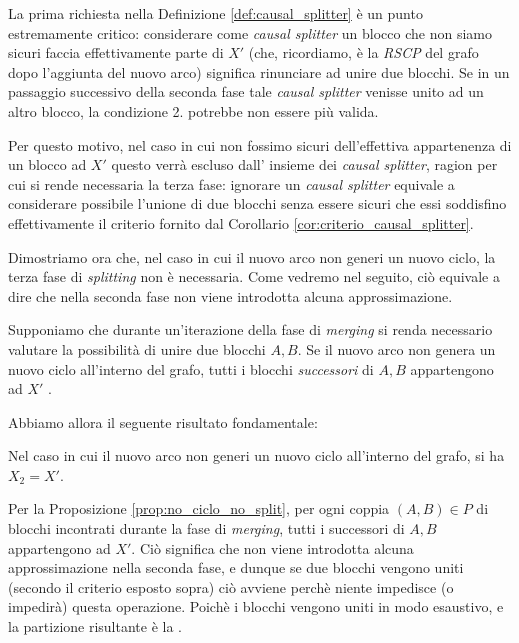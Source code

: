 La prima richiesta nella Definizione \ref{def:causal_splitter} è un punto estremamente critico: considerare come \emph{causal splitter} un blocco che non siamo sicuri faccia effettivamente parte di $X'$ (che, ricordiamo, è la \emph{RSCP} del grafo dopo l'aggiunta del nuovo arco) significa rinunciare ad unire due blocchi. Se in un passaggio successivo della seconda fase tale \emph{causal splitter} venisse unito ad un altro blocco, la condizione 2. potrebbe non essere più valida.

Per questo motivo, nel caso in cui non fossimo sicuri dell'effettiva appartenenza di un blocco ad $X'$ questo verrà escluso dall' insieme dei \emph{causal splitter}, ragion per cui si rende necessaria la terza fase: ignorare un \emph{causal splitter} equivale a considerare possibile l'unione di due blocchi senza essere sicuri che essi soddisfino effettivamente il criterio fornito dal Corollario \ref{cor:criterio_causal_splitter}.

Dimostriamo ora che, nel caso in cui il nuovo arco non generi un nuovo ciclo, la terza fase di \emph{splitting} non è necessaria. Come vedremo nel seguito, ciò equivale a dire che nella seconda fase non viene introdotta alcuna approssimazione.

\begin{proposition}
    \label{prop:no_ciclo_no_split}
    Supponiamo che durante un'iterazione della fase di \emph{merging} si renda necessario valutare la possibilità di unire due blocchi $A,B$. Se il nuovo arco non genera un nuovo ciclo all'interno del grafo, tutti i blocchi \emph{successori} di $A,B$ appartengono ad $X'$ \cite{saha}.
\end{proposition}

Abbiamo allora il seguente risultato fondamentale:

\begin{proposition}
    Nel caso in cui il nuovo arco non generi un nuovo ciclo all'interno del grafo, si ha $X_2 = X'$.
\end{proposition}
\begin{proof2}
    Per la Proposizione \ref{prop:no_ciclo_no_split}, per ogni coppia $(A,B) \in P$ di blocchi incontrati durante la fase di \emph{merging}, tutti i successori di $A,B$ appartengono ad $X'$. Ciò significa che non viene introdotta alcuna approssimazione nella seconda fase, e dunque se due blocchi vengono uniti (secondo il criterio esposto sopra) ciò avviene perchè niente impedisce (o impedirà) questa operazione. Poichè i blocchi vengono uniti in modo esaustivo, e  la partizione risultante è la \rscpnomath.
\end{proof2}

